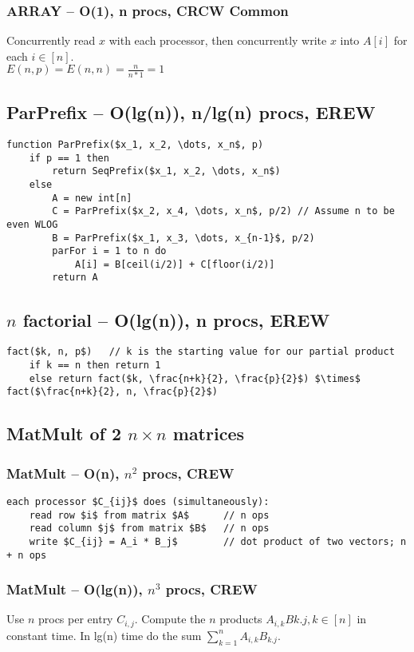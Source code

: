 \documentclass[12pt]{article}
\begin{document}
\subsubsection{ARRAY -- O(1), n procs, CRCW Common}
Concurrently read $x$ with each processor, then concurrently write $x$ into $A[i]$ for each $i \in [n]$.\\
$E(n,p) = E(n,n) = \frac{n}{n*1} = 1$


\subsection{ParPrefix -- O(lg(n)), n/lg(n) procs, EREW}
\begin{lstlisting}
function ParPrefix($x_1, x_2, \dots, x_n$, p)
    if p == 1 then
        return SeqPrefix($x_1, x_2, \dots, x_n$)
    else
        A = new int[n]
        C = ParPrefix($x_2, x_4, \dots, x_n$, p/2) // Assume n to be even WLOG
        B = ParPrefix($x_1, x_3, \dots, x_{n-1}$, p/2)
        parFor i = 1 to n do
            A[i] = B[ceil(i/2)] + C[floor(i/2)]
        return A
\end{lstlisting}



\subsection{$n$ factorial -- O(lg(n)), n procs, EREW}
\begin{lstlisting}
fact($k, n, p$)   // k is the starting value for our partial product
    if k == n then return 1
    else return fact($k, \frac{n+k}{2}, \frac{p}{2}$) $\times$ fact($\frac{n+k}{2}, n, \frac{p}{2}$)
\end{lstlisting}



\subsection{MatMult of 2 $n\times n$ matrices}
\subsubsection{MatMult -- O(n), $n^2$ procs, CREW}
\begin{lstlisting}
each processor $C_{ij}$ does (simultaneously):
    read row $i$ from matrix $A$      // n ops
    read column $j$ from matrix $B$   // n ops
    write $C_{ij} = A_i * B_j$        // dot product of two vectors; n + n ops
\end{lstlisting}
\subsubsection{MatMult -- O(lg(n)), $n^3$ procs, CREW}
Use $n$ procs per entry $C_{i,j}$.
Compute the $n$ products $A_{i,k}B{k.j}, k\in [n]$ in constant time.
In lg(n) time do the sum $\sum_{k=1}^n A_{i,k}B_{k.j}$.
\end{document}
